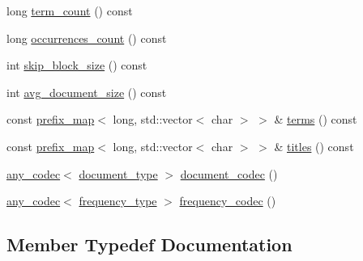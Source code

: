 \begin{DoxyCompactItemize}
\item 
long \mbox{\hyperlink{classirk_1_1v2_1_1inverted__index__view_a4fb0266edc385a4b527198d403f0f976}{term\+\_\+count}} () const
\item 
long \mbox{\hyperlink{classirk_1_1v2_1_1inverted__index__view_aeb876faef5e15b4567e3347b871fb978}{occurrences\+\_\+count}} () const
\item 
int \mbox{\hyperlink{classirk_1_1v2_1_1inverted__index__view_a5dc900fb0b8353d0caede65d28e8c66e}{skip\+\_\+block\+\_\+size}} () const
\item 
int \mbox{\hyperlink{classirk_1_1v2_1_1inverted__index__view_a6397e7c10fc74ba36d76491286e98a15}{avg\+\_\+document\+\_\+size}} () const
\item 
const \mbox{\hyperlink{classirk_1_1prefix__map}{prefix\+\_\+map}}$<$ long, std\+::vector$<$ char $>$ $>$ \& \mbox{\hyperlink{classirk_1_1v2_1_1inverted__index__view_a2daebedf75a2ddc8f88c90cd635afe0f}{terms}} () const
\item 
const \mbox{\hyperlink{classirk_1_1prefix__map}{prefix\+\_\+map}}$<$ long, std\+::vector$<$ char $>$ $>$ \& \mbox{\hyperlink{classirk_1_1v2_1_1inverted__index__view_a192e892479d3199aa534ea8e2b4169b0}{titles}} () const
\item 
\mbox{\hyperlink{namespaceirk_a831a3a869cf19601dbfb5c41765a2e87}{any\+\_\+codec}}$<$ \mbox{\hyperlink{classirk_1_1v2_1_1inverted__index__view_a8441dcf60be934782fdaa9411723700b}{document\+\_\+type}} $>$ \mbox{\hyperlink{classirk_1_1v2_1_1inverted__index__view_aaa1f3b7660025d60cdb815268d56334c}{document\+\_\+codec}} ()
\item 
\mbox{\hyperlink{namespaceirk_a831a3a869cf19601dbfb5c41765a2e87}{any\+\_\+codec}}$<$ \mbox{\hyperlink{classirk_1_1v2_1_1inverted__index__view_ab52405d4c17e6e82893d2650a56e0a32}{frequency\+\_\+type}} $>$ \mbox{\hyperlink{classirk_1_1v2_1_1inverted__index__view_aacf229a3a8f3eddb0181cc0df59ada3a}{frequency\+\_\+codec}} ()
\end{DoxyCompactItemize}


\subsection{Member Typedef Documentation}
\mbox{\label{classirk_1_1v2_1_1inverted__index__view_a0dd0327febf8c41ecfd339374c47ce5f}} 
